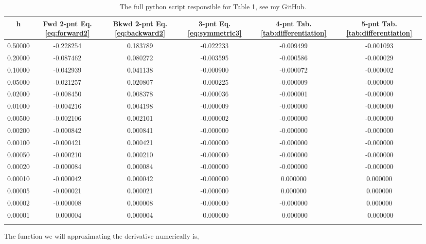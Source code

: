 \documentclass[10pt]{article}
\begin{document}
\begin{table}[!ht]
	\begin{center}
	\caption{Error in evaluating the $d \sin /dx|_{x=1}=0.540302$}
		\label{tab:diff_errors}
		\begin{tabular}{|cccccc|}
		\hline
		h & Fwd 2-pnt Eq. \ref{eq:forward2} & Bkwd 2-pnt Eq. \ref{eq:backward2} & 3-pnt Eq. \ref{eq:symmetric3} & 4-pnt Tab. \ref{tab:differentiation} & 5-pnt Tab. \ref{tab:differentiation} \\
		\hline
		0.50000&-0.228254&0.183789&-0.022233&-0.009499&-0.001093\\ 
		0.20000&-0.087462&0.080272&-0.003595&-0.000586&-0.000029\\ 
		0.10000&-0.042939&0.041138&-0.000900&-0.000072&-0.000002\\ 
		0.05000&-0.021257&0.020807&-0.000225&-0.000009&-0.000000\\ 
		0.02000&-0.008450&0.008378&-0.000036&-0.000001&-0.000000\\ 
		0.01000&-0.004216&0.004198&-0.000009&-0.000000&-0.000000\\ 
		0.00500&-0.002106&0.002101&-0.000002&-0.000000&-0.000000\\ 
		0.00200&-0.000842&0.000841&-0.000000&-0.000000&-0.000000\\ 
		0.00100&-0.000421&0.000421&-0.000000&-0.000000&-0.000000\\ 
		0.00050&-0.000210&0.000210&-0.000000&-0.000000&-0.000000\\ 
		0.00020&-0.000084&0.000084&-0.000000&-0.000000&-0.000000\\ 
		0.00010&-0.000042&0.000042&-0.000000&0.000000&0.000000\\ 
		0.00005&-0.000021&0.000021&-0.000000&0.000000&0.000000\\ 
		0.00002&-0.000008&0.000008&-0.000000&-0.000000&0.000000\\ 
		0.00001&-0.000004&0.000004&-0.000000&-0.000000&-0.000000\\ 
		\hline
		
		\caption{The full python script responsible for Table \ref{tab:diff_errors}, see my \href{https://github.com/jmelahman/computational-physics-solutions/blob/master/exercises_python/exercise1_1.py}{GitHub}.}	
		\end{tabular}
	\end{center}
\end{table}
 The function we will approximating the derivative numerically is,
\end{document}
